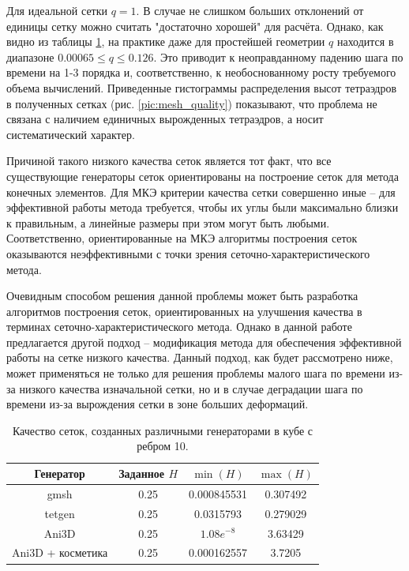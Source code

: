 Для идеальной сетки $q = 1$. В случае не слишком больших отклонений от единицы сетку можно считать "достаточно хорошей" для расчёта. Однако, как видно из таблицы \ref{tbl:mesh-stats-summary}, на практике даже для простейшей геометрии $q$ находится в диапазоне $0.00065 \le q \le 0.126$. Это приводит к неоправданному падению шага по времени на 1-3 порядка и, соответственно, к необоснованному росту требуемого объема вычислений. Приведенные гистограммы распределения высот тетраэдров в полученных сетках (рис. \ref{pic:mesh_quality}) показывают, что проблема не связана с наличием единичных вырожденных тетраэдров, а носит систематический характер.

Причиной такого низкого качества сеток является тот факт, что все существующие генераторы сеток ориентированы на построение сеток для метода конечных элементов. Для МКЭ критерии качества сетки совершенно иные -- для эффективной работы метода требуется, чтобы их углы были максимально близки к правильным, а линейные размеры при этом могут быть любыми. Соответственно, ориентированные на МКЭ алгоритмы построения сеток оказываются неэффективными с точки зрения сеточно-характеристического метода.

Очевидным способом решения данной проблемы может быть разработка алгоритмов построения сеток, ориентированных на улучшения качества в терминах сеточно-характеристического метода. Однако в данной работе предлагается другой подход -- модификация метода для обеспечения эффективной работы на сетке низкого качества. Данный подход, как будет рассмотрено ниже, может применяться не только для решения проблемы малого шага по времени из-за низкого качества изначальной сетки, но и в случае деградации шага по времени из-за вырождения сетки в зоне больших деформаций.

\begin{table}[h]
\centering
\begin{tabular}{|c|c|c|c|}
\hline
Генератор & Заданное $H$ & $\min(H)$ & $\max(H)$ \\
\hline
gmsh & 0.25 & 0.000845531 & 0.307492 \\
tetgen & 0.25 & 0.0315793 & 0.279029 \\
Ani3D & 0.25 & $1.08e^{-8}$ & 3.63429 \\
Ani3D + косметика & 0.25 & 0.000162557 & 3.7205 \\
\hline
\end{tabular}
\caption{Качество сеток, созданных различными генераторами в кубе с ребром 10.}
\label{tbl:mesh-stats-summary}
\end{table}


